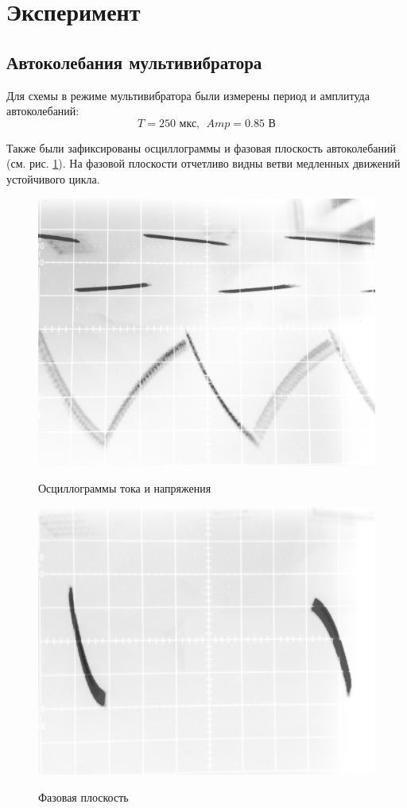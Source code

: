 
\usepackage{mwe}



\def\labauthors{Виноградов И.Д., Шиков А.П.}
\def\labgroup{430}
\def\labnumber{2}
\def\labtheme{Разрывные колебания}


\newpage
\section*{Эксперимент}

\subsection*{Автоколебания мультивибратора}

Для схемы в режиме мультивибратора были измерены период и амплитуда автоколебаний:
$$ T = 250 \text{ мкс},~~ Amp = 0.85 \text{ В} $$

Также были зафиксированы осциллограммы и фазовая плоскость автоколебаний (см. рис. \ref{fig:1}). На фазовой плоскости
отчетливо видны ветви медленных движений устойчивого цикла.
\begin{figure}[h!]
	\begin{minipage}{.49\linewidth}
		\centering
		\includegraphics[width = .7\linewidth]{img/1.jpg}
		\caption*{Осциллограммы тока и напряжения}

	\end{minipage}
	\begin{minipage}{.49\linewidth}
		\centering
		\includegraphics[width = .7\linewidth]{img/2.jpg}
		\caption*{Фазовая плоскость}
	\end{minipage}
	\caption{}
	\label{fig:1}
\end{figure}



